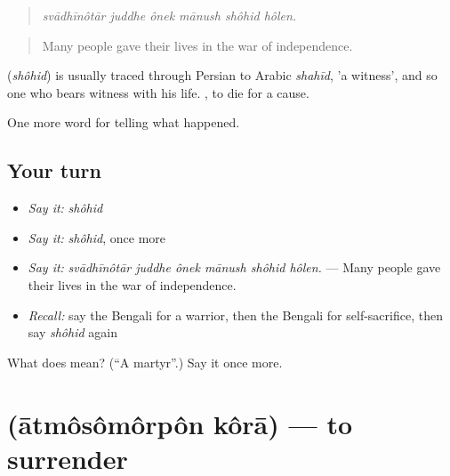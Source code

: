 \begin{quote}
     
\end{quote}

\begin{quote}
\emph{svādhīnôtār juddhe ônek mānush shôhid hôlen.}
\end{quote}

\begin{quote}
Many people gave their lives in the war of independence.
\end{quote}

\begin{cousinweb}
\textbf{} (\emph{shôhid}) is usually traced through Persian to Arabic \emph{shahīd}, 'a witness', and so one who bears witness with his life.  , to die for a cause.
\end{cousinweb}

\begin{grammarlens}[title={What you've built}]
One more word for telling what happened.
\end{grammarlens}

\subsection*{Your turn}
\begin{itemize}
\raggedright
  \item \emph{Say it:} \emph{shôhid}
  \item \emph{Say it:} \emph{shôhid}, once more
  \item \emph{Say it:} \emph{svādhīnôtār juddhe ônek mānush shôhid hôlen.} — Many people gave their lives in the war of independence.
  \item \emph{Recall:} say the Bengali for a warrior, then the Bengali for self-sacrifice, then say \emph{shôhid} again
\end{itemize}

\begin{tcolorbox}[breakable,colback=teal!4,colframe=teal!35!black,title={Before you move on}]
What does  mean? (\textquotedblleft{}A martyr\textquotedblright{}.) Say it once more.
\end{tcolorbox}
\section[\texorpdfstring{\bn{আত্মসমর্পণ} \bn{করা} (ātmôsômôrpôn kôrā)}{আত্মসমর্পণ করা (ātmôsômôrpôn kôrā)}]{  (ātmôsômôrpôn kôrā) — to surrender}

